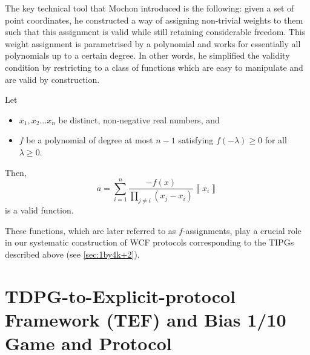 \documentclass{theoretics}
\begin{document}
The key technical tool that Mochon introduced is the following: given a set
of point coordinates, he constructed a way of assigning non-trivial  weights
to them such that this assignment is valid while still retaining considerable
freedom. This weight assignment is parametrised
by a polynomial and works for essentially all polynomials up to a
certain degree. In other words, he simplified the validity condition
by restricting to a class of functions which are easy to manipulate
and are valid by construction.
\begin{lemma}
  Let \label{lem:fAssignment}
  \begin{itemize}
    \item $x_{1},x_{2}\dots x_{n}$ be distinct, non-negative real numbers, and
    \item $f$ be a polynomial of degree at most $n-1$ satisfying $f(-\lambda)\ge0$
          for all $\lambda\ge0$.
  \end{itemize}
  Then,
  \begin{equation}
    a=\sum_{i=1}^{n}\frac{-f(x)}{\prod_{j\neq i}(x_{j}-x_{i})}\left\llbracket x_{i}\right\rrbracket 	\label{eq:fAssignmentInitial}
  \end{equation}
  is a valid function.
\end{lemma}


These functions, which are later referred to as $f$-assignments, play a crucial role in our systematic construction of WCF protocols corresponding to the TIPGs described above (see \cref{sec:1by4k+2}).

%



%
%
%
%
\section{TDPG-to-Explicit-protocol Framework (TEF) and Bias 1/10 Game and  Protocol\label{sec:TEF}}

%
%
%
%
%
%
%
\end{document}
